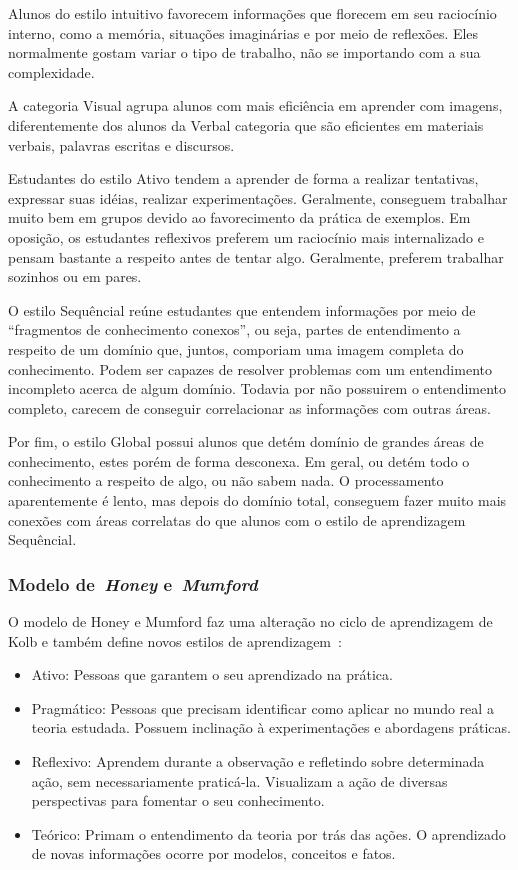 Alunos do estilo intuitivo favorecem informações que florecem em seu raciocínio interno, como a memória, situações imaginárias e por meio de reflexões. Eles normalmente gostam variar o tipo de trabalho, não se importando com a sua complexidade.

A categoria Visual agrupa alunos com mais eficiência em aprender com imagens, diferentemente dos alunos da Verbal categoria que são eficientes em materiais verbais, palavras escritas e discursos.

Estudantes do estilo Ativo tendem a aprender de forma a realizar tentativas, expressar suas idéias, realizar experimentações. Geralmente, conseguem trabalhar muito bem em grupos devido ao favorecimento da prática de exemplos. Em oposição, os estudantes reflexivos preferem um raciocínio mais internalizado e pensam bastante a respeito antes de tentar algo. Geralmente, preferem trabalhar sozinhos ou em pares.

O estilo Sequêncial reúne estudantes que entendem informações por meio de ``fragmentos de conhecimento conexos'', ou seja, partes de entendimento a respeito de um domínio que, juntos, comporiam uma imagem completa do conhecimento. Podem ser capazes de resolver problemas com um entendimento incompleto acerca de algum domínio. Todavia por não possuirem o entendimento completo, carecem de conseguir correlacionar as informações com outras áreas.

Por fim, o estilo Global possui alunos que detém domínio de grandes áreas de conhecimento, estes porém de forma desconexa. Em geral, ou detém todo o conhecimento a respeito de algo, ou não sabem nada. O processamento aparentemente é lento, mas depois do domínio total, conseguem fazer muito mais conexões com áreas correlatas do que alunos com o estilo de aprendizagem Sequêncial.

\subsubsection{Modelo de~\emph{Honey} e~\emph{Mumford}}
O modelo de Honey e Mumford faz uma alteração no ciclo de aprendizagem de Kolb e também define novos estilos de aprendizagem~\cite{muhlbeier12}:
\begin{itemize}
	\item Ativo: Pessoas que garantem o seu aprendizado na prática.
	\item Pragmático: Pessoas que precisam identificar como aplicar no mundo real a teoria estudada. Possuem inclinação à experimentações e abordagens práticas.
	\item Reflexivo: Aprendem durante a observação e refletindo sobre determinada ação, sem necessariamente praticá-la. Visualizam a ação de diversas perspectivas para fomentar o seu conhecimento.
	\item Teórico: Primam o entendimento da teoria por trás das ações. O aprendizado de novas informações ocorre por modelos, conceitos e fatos.

\end{itemize}

